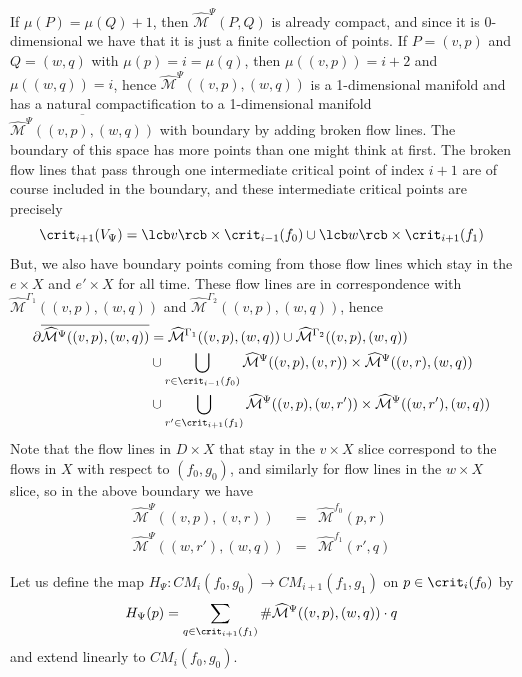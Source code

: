 If $\mu(P)=\mu(Q)+1$, then $\widehat{\mathcal M}^\Psi(P,Q)$ is already compact, and since it is 0-dimensional we have that it is just a finite collection of points. If $P=(v,p)$ and $Q=(w,q)$ with $\mu(p)=i=\mu(q)$, then $\mu((v,p))=i+2$ and $\mu((w,q))=i$, hence $\widehat{\mathcal M}^\Psi((v,p),(w,q))$ is a 1-dimensional manifold and has a natural compactification to a 1-dimensional manifold $\overline{\widehat{\mathcal M}^\Psi((v,p),(w,q))}$ with boundary by adding broken flow lines. The boundary of this space has more points than one might think at first. The broken flow lines that pass through one intermediate critical point of index $i+1$ are of course included in the boundary, and these intermediate critical points are precisely
\[ \crit_{i+1}(V_\Psi) = \lcb v \rcb \times \crit_{i-1}(f_0) \cup \lcb w \rcb \times \crit_{i+1}(f_1) \]
But, we also have boundary points coming from those flow lines which stay in the $e \times X$ and $e' \times X$ for all time. These flow lines are in correspondence with $\widehat{\mathcal M}^{\Gamma_1}((v,p),(w,q))$ and $\widehat{\mathcal M}^{\Gamma_2}((v,p),(w,q))$, hence
\begin{align*}
\partial \overline{\widehat{\mathcal M}^\Psi((v,p),(w,q))} &= \widehat{\mathcal M}^{\Gamma_1}((v,p),(w,q)) \cup \widehat{\mathcal M}^{\Gamma_2}((v,p),(w,q)) \\
	&\cup \bigcup_{r \in \crit_{i-1}(f_0)} \widehat{\mathcal M}^\Psi((v,p),(v,r)) \times \widehat{\mathcal M}^\Psi((v,r),(w,q)) \\
	&\cup \bigcup_{r' \in \crit_{i+1}(f_1)} \widehat{\mathcal M}^\Psi((v,p),(w,r')) \times \widehat{\mathcal M}^\Psi((w,r'),(w,q))
\end{align*}
Note that the flow lines in $D \times X$ that stay in the $v \times X$ slice correspond to the flows in $X$ with respect to $(f_0,g_0)$, and similarly for flow lines in the $w \times X$ slice, so in the above boundary we have
\[ \begin{array}{ccc}
\widehat{\mathcal M}^\Psi((v,p),(v,r)) &=& \widehat{\mathcal M}^{f_0}(p,r) \\
\widehat{\mathcal M}^\Psi((w,r'),(w,q)) &=& \widehat{\mathcal M}^{f_1}(r',q) 
\end{array} \]

Let us define the map $H_\Psi : CM_i(f_0,g_0) \rightarrow CM_{i+1}(f_1,g_1)$ on $p \in \crit_i(f_0)$ by
\[ H_\Psi(p) = \sum_{q \in \crit_{i+1}(f_1)} \# \widehat{\mathcal M}^\Psi((v,p),(w,q)) \cdot q \]
and extend linearly to $CM_i(f_0,g_0)$.

